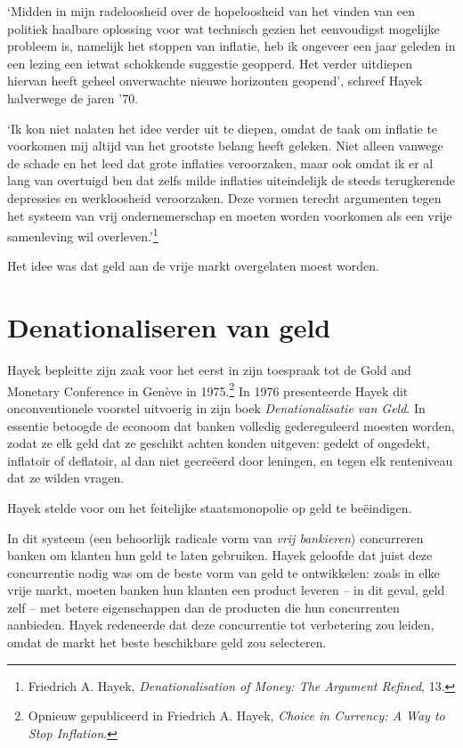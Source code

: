\documentclass[
  a5paper,
  smalldemyvopaper,11pt,twoside,onecolumn,openright,extrafontsizes,
hidelinks]{memoir}
\renewenvironment{quote}%
               {\list{}{\rightmargin=.3cm\leftmargin=.3cm}%
                \itshape \item[]}%
               {\endlist}
\begin{document}
`Midden in mijn radeloosheid over de hopeloosheid van het vinden van een
politiek haalbare oplossing voor wat technisch gezien het eenvoudigst
mogelijke probleem is, namelijk het stoppen van inflatie, heb ik
ongeveer een jaar geleden in een lezing een ietwat schokkende suggestie
geopperd. Het verder uitdiepen hiervan heeft geheel onverwachte nieuwe
horizonten geopend', schreef Hayek halverwege de jaren '70.

\begin{quote}
`Ik kon niet nalaten het idee verder uit te diepen, omdat de taak om
inflatie te voorkomen mij altijd van het grootste belang heeft geleken.
Niet alleen vanwege de schade en het leed dat grote inflaties
veroorzaken, maar ook omdat ik er al lang van overtuigd ben dat zelfs
milde inflaties uiteindelijk de steeds terugkerende depressies en
werkloosheid veroorzaken. Deze vormen terecht argumenten tegen het
systeem van vrij ondernemerschap en moeten worden voorkomen als een
vrije samenleving wil overleven.'\footnote{\hspace{0pt}Friedrich A.
  Hayek, \emph{Denationalisation of Money: The Argument Refined}, 13.}
\end{quote}

Het idee was dat geld aan de vrije markt overgelaten moest worden.

\section{Denationaliseren van geld}\label{denationaliseren-van-geld}

Hayek bepleitte zijn zaak voor het eerst in zijn toespraak tot de Gold
and Monetary Conference in Genève in 1975.\footnote{Opnieuw gepubliceerd
  in Friedrich A. Hayek, \emph{Choice in Currency: A Way to Stop
  Inflation}.} In 1976 presenteerde Hayek dit onconventionele voorstel
uitvoerig in zijn boek \emph{Denationalisatie van Geld}. In essentie
betoogde de econoom dat banken volledig gedereguleerd moesten worden,
zodat ze elk geld dat ze geschikt achten konden uitgeven: gedekt of
ongedekt, inflatoir of deflatoir, al dan niet gecreëerd door leningen,
en tegen elk renteniveau dat ze wilden vragen.

Hayek stelde voor om het feitelijke staatsmonopolie op geld te
beëindigen.

In dit systeem (een behoorlijk radicale vorm van \emph{vrij bankieren})
concurreren banken om klanten hun geld te laten gebruiken. Hayek
geloofde dat juist deze concurrentie nodig was om de beste vorm van geld
te ontwikkelen: zoals in elke vrije markt, moeten banken hun klanten een
product leveren -- in dit geval, geld zelf -- met betere eigenschappen
dan de producten die hun concurrenten aanbieden. Hayek redeneerde dat
deze concurrentie tot verbetering zou leiden, omdat de markt het beste
beschikbare geld zou selecteren.
\end{document}

